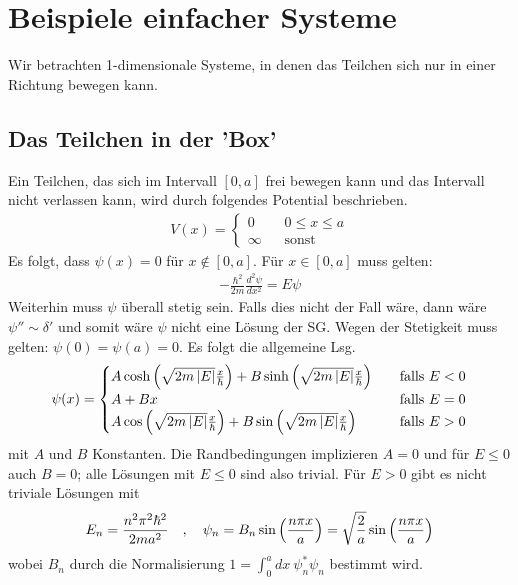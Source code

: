 \section{Beispiele einfacher Systeme}

Wir betrachten 1-dimensionale Systeme, in denen das Teilchen sich nur in
einer Richtung bewegen kann.

\subsection{Das Teilchen in der 'Box'}
Ein Teilchen, das sich im Intervall $[0,a]$ frei bewegen kann und das Intervall
nicht verlassen kann, wird durch folgendes Potential beschrieben.
\begin{align*}
    V(x) = \begin{cases}
        0 \hspace{10pt} &0 \leq x \leq a \\
        \infty \hspace{10pt} &\text{sonst}
    \end{cases}
\end{align*}
Es folgt, dass $\psi(x) = 0$ für $x \notin [0,a]$. Für $x \in [0,a]$ muss
gelten:
\begin{align}\label{zeitunabhSGohnePot}
    - \frac{\hbar^2}{2m} \frac{d^2 \psi}{d x^2} = E \psi
\end{align}
Weiterhin muss $\psi$ überall stetig sein. Falls dies nicht der Fall wäre,
dann wäre $\psi'' \sim \delta'$ und somit wäre $\psi$ nicht eine Lösung der
SG. Wegen der Stetigkeit muss gelten: $\psi(0) = \psi(a) = 0$. Es folgt die
allgemeine Lsg.
\begin{align*}
    \psi (x) = \begin{cases}
        A \cosh \left( \sqrt{2 m \left\vert E \right\vert} \frac{x}{\hbar} \right) +
            B \sinh \left( \sqrt{2 m \left\vert E \right\vert} \frac{x}{\hbar} \right)
            \hspace{10pt} &\text{falls } E < 0
        \\
        A + B x \hspace{10pt} &\text{falls } E = 0
        \\
        A \cos \left( \sqrt{2 m \left\vert E \right\vert} \frac{x}{\hbar} \right) +
            B \sin \left( \sqrt{2m \left\vert E \right\vert} \frac{x}{\hbar} \right)
            \hspace{10pt} &\text{falls } E > 0
    \end{cases}
\end{align*}
mit $A$ und $B$ Konstanten. Die Randbedingungen implizieren $A=0$ und für
$E \leq 0$ auch $B=0$; alle Lösungen mit $E \leq 0$ sind also trivial. Für
$E > 0$ gibt es nicht triviale Lösungen mit
\begin{align*}
    E_n = \frac{n^2 \pi^2 \hbar^2}{2 m a^2}
    \hspace{10pt} , \hspace{10pt}
    \psi_n = B_n \sin \left( \frac{n \pi x}{a} \right)
    = \sqrt{\frac{2}{a}} \sin \left( \frac{n \pi x}{a} \right)
\end{align*}
wobei $B_n$ durch die Normalisierung $1 = \int_0^a dx \ \psi_n^\ast \psi_n$
bestimmt wird.

